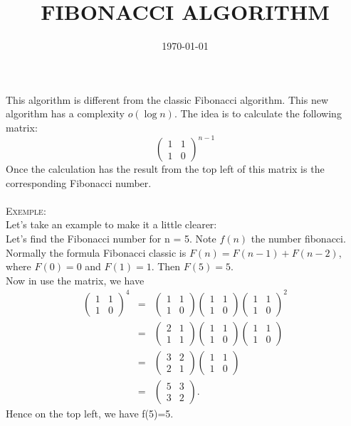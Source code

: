 \documentclass[12pt, a4paper]{article}
\title{FIBONACCI ALGORITHM}
\date{\today}
\author{}
\begin{document}
\maketitle

This algorithm is different from the classic Fibonacci algorithm. This new algorithm has a complexity $o(\log n)$. The idea is to calculate the following matrix: 
$$\left(\begin{array}{cc}1 & 1 \\ 1 & 0\end{array}\right)^{n-1}$$ Once the calculation has the result from the top left of this matrix is the corresponding Fibonacci number.\\ \\

\textsc{Exemple:}\\
Let's take an example to make it a little clearer:\\
Let's find the Fibonacci number for n = 5. Note $f(n)$ the number fibonacci. Normally the formula Fibonacci classic is $F(n) = F(n-1) + F(n-2)$, where $F(0)=0$ and $F(1)=1$. Then $F(5)=5$.\\
Now in use the matrix, we have 
$$\begin{array}{ccc}
\left(\begin{array}{cc} 1 & 1 \\ 1 & 0\end{array}\right)^{4} & = & \left(\begin{array}{cc} 1 & 1 \\ 1 & 0\end{array}\right)  \left(\begin{array}{cc} 1 & 1 \\ 1 & 0\end{array}\right) \left(\begin{array}{cc} 1 & 1 \\ 1 & 0\end{array}\right)^{2} \\ 
 & = &\left(\begin{array}{cc} 2 & 1 \\ 1 & 1\end{array}\right)   \left(\begin{array}{cc} 1 & 1 \\ 1 & 0\end{array}\right) \left(\begin{array}{cc} 1 & 1 \\ 1 & 0\end{array}\right) \\ 
 & = & \left(\begin{array}{cc} 3 & 2 \\ 2 & 1\end{array}\right)\left(\begin{array}{cc} 1 & 1 \\ 1 & 0\end{array}\right) \\
 & = & \left(\begin{array}{cc} 5 & 3 \\ 3 & 2\end{array}\right).
\end{array}$$
Hence on the top left, we have f(5)=5.
\end{document}
